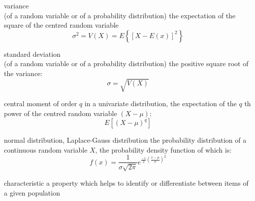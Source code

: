 \documentclass[avery5371,grid]{flashcards}
\begin{document}
\begin{flashcard}[Definition]{variance \\ (of a random variable or of a probability distribution)}
\vspace{\fill}
    the expectation of the square of the centred random variable
    \begin{equation*}
        \sigma^2 = V(X) = E\left\{ \left[ X-E(x) \right]^2 \right\}
    \end{equation*}
\vspace{\fill}
\end{flashcard}

\begin{flashcard}[Definition]{standard deviation \\ (of a random variable or of a probability distribution)}
\vspace{\fill}
    the positive square root of the variance:
    \begin{equation*}
        \sigma = \sqrt{ V(X) }
    \end{equation*}
\vspace{\fill}
\end{flashcard}

\begin{flashcard}[Definition]{central moment of order $q$}
\vspace{\fill}
    in a univariate distribution, the expectation of the $q$ th power of the centred random variable $(X−\mu)$:
    \begin{equation*}
        E \left[ \left( X - \mu \right)^q \right]
    \end{equation*}
\vspace{\fill}
\end{flashcard}

\begin{flashcard}[Definition]{normal distribution, Laplace-Gauss distribution}
\vspace{\fill}
    the probability distribution of a continuous random variable $X$,
        the probability density function of which is:
    \begin{equation*}
        f(x) = \frac{1}{\sigma\sqrt{2\pi}} e^{\frac{-1}{2}\left(\frac{x-\mu}{\sigma}\right)^2 }
    \end{equation*}
\vspace{\fill}
\end{flashcard}

\begin{flashcard}[Definition]{characteristic}
\vspace{\fill}
    a property which helps to identify or differentiate between items of a given population
\vspace{\fill}
\end{flashcard}
\end{document}

